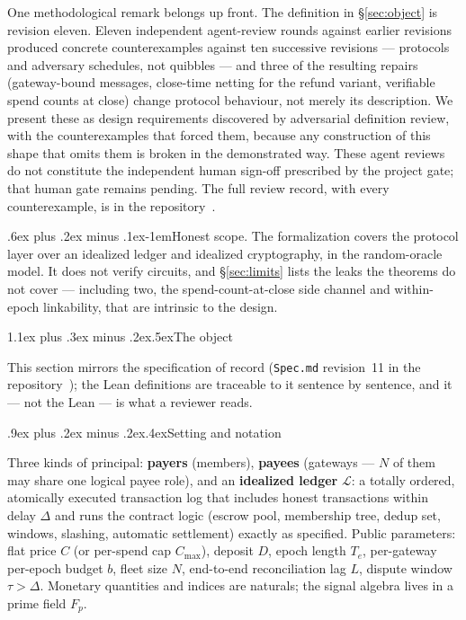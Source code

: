 \documentclass[9pt]{extarticle}
\makeatletter
\renewcommand\section{\@startsection{section}{1}{0pt}%
  {1.1ex plus .3ex minus .2ex}{.5ex}{\normalfont\Large\bfseries}}
\renewcommand\subsection{\@startsection{subsection}{2}{0pt}%
  {.9ex plus .2ex minus .2ex}{.4ex}{\normalfont\large\bfseries}}
\renewcommand\paragraph{\@startsection{paragraph}{4}{0pt}%
  {.6ex plus .2ex minus .1ex}{-1em}{\normalfont\normalsize\bfseries}}
\newcommand{\Cmax}{C_{\max}}
\makeatother
\begin{document}
One methodological remark belongs up front. The definition in
\S\ref{sec:object} is revision eleven. Eleven independent agent-review rounds
against earlier revisions produced concrete counterexamples against ten
successive revisions --- protocols and adversary schedules, not quibbles
--- and three of the
resulting repairs (gateway-bound messages, close-time netting for the
refund variant, verifiable spend counts at close) change protocol
behaviour, not merely its description. We present these as design
requirements discovered by adversarial definition review, with the
counterexamples that forced them, because any construction of this shape
that omits them is broken in the demonstrated way. These agent reviews do
not constitute the independent human sign-off prescribed by the project
gate; that human gate remains pending. The full review record,
with every counterexample, is in the repository~\cite{zkpcrepo}.

\paragraph{Honest scope.} The formalization covers the protocol layer over
an idealized ledger and idealized cryptography, in the random-oracle
model. It does not verify circuits, and \S\ref{sec:limits} lists the leaks
the theorems do not cover --- including two, the spend-count-at-close side
channel and within-epoch linkability, that are intrinsic to the design.

\section{The object}\label{sec:object}

This section mirrors the specification of record (\texttt{Spec.md}
revision~11 in the repository~\cite{zkpcrepo}); the Lean definitions are
traceable to it sentence by sentence, and it --- not the Lean --- is what
a reviewer reads.

\subsection{Setting and notation}

Three kinds of principal: \textbf{payers} (members), \textbf{payees}
(gateways --- $N$ of them may share one logical payee role), and an
\textbf{idealized ledger} $\mathcal{L}$: a totally ordered, atomically
executed transaction log that includes honest transactions within delay
$\Delta$ and runs the contract logic (escrow pool, membership tree, dedup
set, windows, slashing, automatic settlement) exactly as specified. Public
parameters: flat price $C$ (or per-spend cap $\Cmax$), deposit $D$, epoch
length $T_e$, per-gateway per-epoch budget $b$, fleet size $N$, end-to-end
reconciliation lag $L$, dispute window $\tau > \Delta$. Monetary
quantities and indices are naturals; the signal algebra lives in a prime
field $F_p$.
\end{document}
